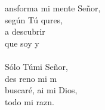 \begin{cancion}%
	ansforma mi mente Señor,\\
	según Tú qures,\\
	a descubrir\\
	que soy y\\
\jump\\
	Sólo Túmi Señor,\\
	des reno mi m\\
	 buscaré, ai mi Dios,\\
	 todo mi razn.\\
\end{cancion}%
